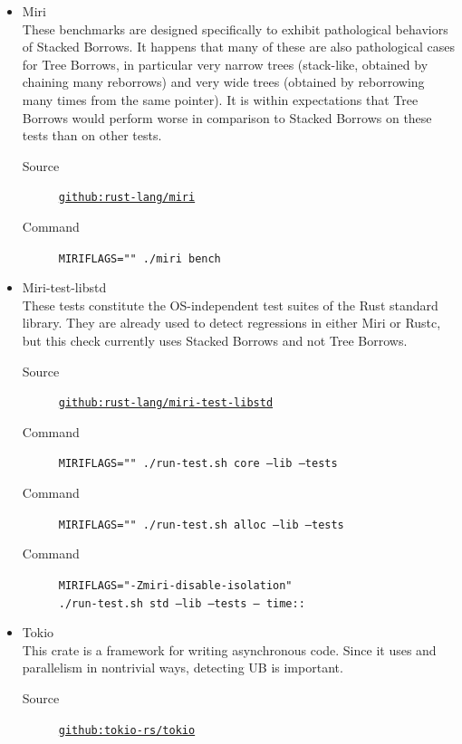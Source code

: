 \documentclass[a4paper,11pt]{article}
\theoremstyle{plain}
\theoremstyle{definition}
\theoremstyle{remark}
\newcommand{\tcode}[1]{\rstinline{#1}}
\begin{document}
\begin{itemize}
    \item Miri\\
        These benchmarks are designed specifically to exhibit pathological behaviors of
        Stacked Borrows. It happens that many of these are also pathological cases for Tree Borrows,
        in particular very narrow trees (stack-like, obtained by chaining many reborrows)
        and very wide trees (obtained by reborrowing many times from the same pointer).
        It is within expectations that Tree Borrows would perform worse in comparison
        to Stacked Borrows on these tests than on other tests.
        \begin{description}
            \item[Source] \href{https://github.com/rust-lang/miri}{\texttt{github:rust-lang/miri}}
            \item[Command] \texttt{MIRIFLAGS="" ./miri bench}
        \end{description}
    \item Miri-test-libstd\\
        These tests constitute the OS-independent test suites of the Rust standard library. They
        are already used to detect regressions in either Miri or Rustc, but this check currently
        uses Stacked Borrows and not Tree Borrows.
        \begin{description}
            \item[Source] \href{https://github.com/rust-lang/miri-test-libstd}{\texttt{github:rust-lang/miri-test-libstd}}
            \item[Command] \texttt{MIRIFLAGS="" ./run-test.sh core --lib --tests}
            \item[Command] \texttt{MIRIFLAGS="" ./run-test.sh alloc --lib --tests}
            \item[Command] \texttt{MIRIFLAGS="-Zmiri-disable-isolation"}\\
                \texttt{./run-test.sh std --lib --tests -- time::}
        \end{description}
    \item Tokio\\
        This crate is a framework for writing asynchronous code. Since it uses \tcode{unsafe} and
        parallelism in nontrivial ways, detecting UB is important.
        \begin{description}
            \item[Source] \href{https://github.com/tokio-rs/tokio}{\texttt{github:tokio-rs/tokio}}

\end{description}
\end{itemize}
\end{document}
